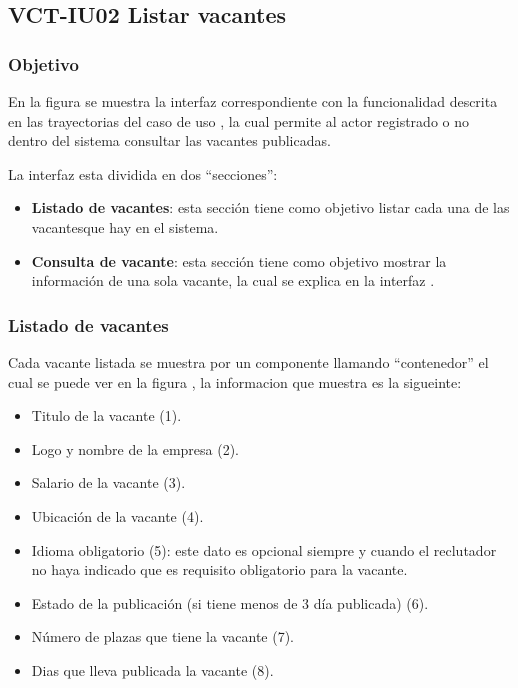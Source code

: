 \clearpage
\subsection{VCT-IU02 Listar vacantes}

\subsubsection{Objetivo}
En la figura  se muestra la interfaz correspondiente con la funcionalidad descrita en las
trayectorias del caso de uso  , la cual permite al actor registrado o no dentro del sistema consultar 
las vacantes publicadas.

La interfaz  esta dividida en dos ``secciones'':
\begin{itemize}
   \item \textbf{Listado de vacantes}: esta sección tiene como objetivo listar cada una de las vacantesque hay en el sistema.
   \item \textbf{Consulta de vacante}: esta sección tiene como objetivo mostrar la información de una sola vacante, la cual se explica en 
   la interfaz .
\end{itemize}
\subsubsection{Listado de vacantes}
Cada vacante listada se muestra por un componente llamando ``contenedor'' el cual se puede ver en la figura , la informacion que 
muestra es la sigueinte: 
\begin{itemize}
   \item Titulo de la vacante (1).
   \item Logo y nombre de la empresa (2).
   \item Salario de la vacante (3).
   \item Ubicación de la vacante (4).
   \item Idioma obligatorio (5): este dato es opcional siempre y cuando el reclutador no haya indicado que es requisito obligatorio 
   para la vacante.
   \item Estado de la publicación (si tiene menos de 3 día publicada) (6).
   \item Número de plazas que tiene la vacante (7).
   \item Dias que lleva publicada la vacante (8).
\end{itemize}

